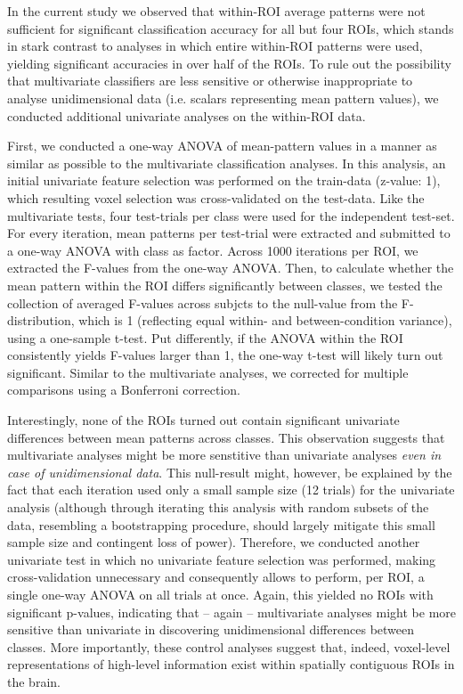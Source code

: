 \documentclass[jou,12pt,a4paper]{apa6}
\begin{document}
\noindent In the current study we observed that within-ROI average patterns were not sufficient for significant classification accuracy for all but four ROIs, which stands in stark contrast to analyses in which entire within-ROI patterns were used, yielding significant accuracies in over half of the ROIs. To rule out the possibility that multivariate classifiers are less sensitive or otherwise inappropriate to analyse unidimensional data (i.e. scalars representing mean pattern values), we conducted additional univariate analyses on the within-ROI data.

First, we conducted a one-way ANOVA of mean-pattern values in a manner as similar as possible to the multivariate classification analyses. In this analysis, an initial univariate feature selection was performed on the train-data (z-value: 1), which resulting voxel selection was cross-validated on the test-data. Like the multivariate tests, four test-trials per class were used for the independent test-set. For every iteration, mean patterns per test-trial were extracted and submitted to a one-way ANOVA with class as factor. Across 1000 iterations per ROI, we extracted the F-values from the one-way ANOVA. Then, to calculate whether the mean pattern within the ROI differs significantly between classes, we tested the collection of averaged F-values across subjcts to the null-value from the F-distribution, which is 1 (reflecting equal within- and between-condition variance), using a one-sample t-test. Put differently, if the ANOVA within the ROI consistently yields F-values larger than 1, the one-way t-test will likely turn out significant. Similar to the multivariate analyses, we corrected for multiple comparisons using a Bonferroni correction.

Interestingly, none of the ROIs turned out contain significant univariate differences between mean patterns across classes. This observation suggests that multivariate analyses might be more senstitive than univariate analyses \emph{even in case of unidimensional data}. This null-result might, however, be explained by the fact that each iteration used only a small sample size (12 trials) for the univariate analysis (although through iterating this analysis with random subsets of the data, resembling a bootstrapping procedure, should largely mitigate this small sample size and contingent loss of power). Therefore, we conducted another univariate test in which no univariate feature selection was performed, making cross-validation unnecessary and consequently allows to perform, per ROI, a single one-way ANOVA on all trials at once. Again, this yielded no ROIs with significant p-values, indicating that -- again -- multivariate analyses might be more sensitive than univariate in discovering unidimensional differences between classes. More importantly, these control analyses suggest that, indeed, voxel-level representations of high-level information exist within spatially contiguous ROIs in the brain.
\end{document}
